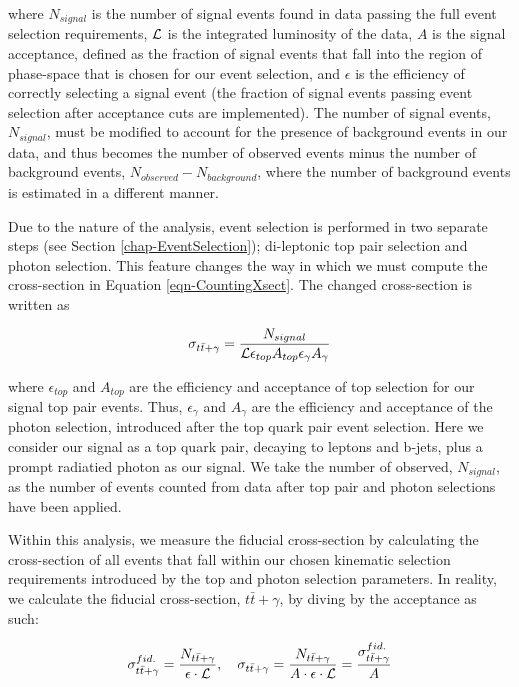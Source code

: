 where $N_{signal}$ is the number of signal events found in data passing the full event selection requirements, $\mathcal{L}$ is the integrated luminosity of the data, $A$ is the signal acceptance, defined as the fraction of signal events that fall into the region of phase-space that is chosen for our event selection, and $\epsilon$ is the efficiency of correctly selecting a signal event (the fraction of signal events passing event selection after acceptance cuts are implemented). The number of signal events, $N_{signal}$, must be modified to account for the presence of background events in our data, and thus becomes the number of observed events minus the number of background events, $N_{observed} - N_{background}$, where the number of background events is estimated in a different manner. 

Due to the nature of the analysis, event selection is performed in two separate steps (see Section \ref{chap-EventSelection}); di-leptonic top pair selection and photon selection. This feature changes the way in which we must compute the cross-section in Equation \ref{eqn-CountingXsect}. The changed cross-section is written as

\begin{equation}
\sigma_{t\bar{t}+\gamma} = \frac{N_{signal}}{\mathcal{L} \epsilon_{top} A_{top} \epsilon_{\gamma} A_{\gamma}}
\end{equation}

where $\epsilon_{top}$ and $A_{top}$ are the efficiency and acceptance of top selection for our signal top pair events. Thus, $\epsilon_{\gamma}$ and $A_{\gamma}$ are the efficiency and acceptance of the photon selection, introduced after the top quark pair event selection. Here we consider our signal as a top quark pair, decaying to leptons and b-jets, plus a prompt radiatied photon as our signal. We take the number of observed, $N_{signal}$, as the number of events counted from data after top pair and photon selections have been applied.

Within this analysis, we measure the fiducial cross-section by calculating the cross-section of all events that fall within our chosen kinematic selection requirements introduced by the top and photon selection parameters. In reality, we calculate the fiducial cross-section, $t\bar{t}+\gamma$, by diving by the acceptance as such:

\begin{equation}
\sigma_{t\bar{t}+\gamma}^{fid.} = \frac{N_{t\bar{t}+\gamma}}{\epsilon \cdot \mathcal{L}}, \quad \sigma_{t\bar{t}+\gamma} = \frac{N_{t\bar{t}+\gamma}}{A \cdot \epsilon \cdot \mathcal{L}} = \frac{\sigma_{t\bar{t}+\gamma}^{fid.}}{A}
\end{equation}


